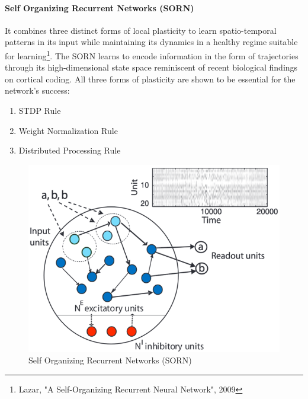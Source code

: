 \documentclass[main]{subfiles}
\begin{document}
\paragraph{Self Organizing Recurrent Networks (SORN)}
It combines three distinct forms of local plasticity to learn spatio-temporal patterns in its input while maintaining its dynamics in a healthy regime suitable for learning\footnote{Lazar, "A Self-Organizing Recurrent Neural Network", 2009}. The SORN learns to encode information in the form of trajectories through its high-dimensional state space reminiscent of recent biological findings on cortical coding. All three forms of plasticity are shown to be essential for the network's success:
\begin{enumerate}
    \item STDP Rule
    \item Weight Normalization Rule
    \item Distributed Processing Rule
\end{enumerate}

\begin{figure}[H]
    \centering
    \includegraphics[width=0.6\linewidth]{13_LearningInRecurrentNeuronalNetworks/figures/sorn.png}
    \caption{Self Organizing Recurrent Networks (SORN)}
    \label{fig:sorn}
\end{figure}
\end{document}
